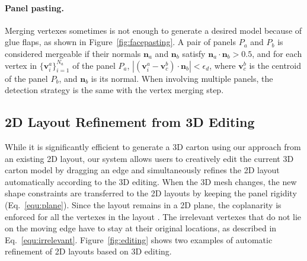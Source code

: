 \paragraph{Panel pasting.} Merging vertexes sometimes is not enough to generate a desired model because of glue flaps, as shown in Figure~\ref{fig:facepasting}. 
A pair of panels $P_a$ and $P_b$ is considered mergeable if their normals $\mathbf{n}_a$ and $\mathbf{n}_b$ satisfy $\mathbf{n}_a \cdot \mathbf{n}_b > 0.5$, and for each vertex in $\{\mathbf{v}^{a}_{i}\}_{i=1}^{N_a}$ of the panel $P_a$,  $|(\mathbf{v}^{a}_{i} - \mathbf{v}_{c}^b) \cdot \mathbf{n}_b| < \epsilon_d$, where $\mathbf{v}_{c}^b$ is the centroid of the panel $P_b$, and $\mathbf{n}_b$ is its normal. When involving multiple panels, the detection strategy is the same with the vertex merging step. 




\subsection{2D Layout Refinement from 3D Editing}

While it is significantly efficient to generate a 3D carton using our approach from an existing 2D layout, our system allows users to creatively edit the current 3D carton model by dragging an edge and simultaneously refines the 2D layout automatically according to the 3D editing.
%
When the 3D mesh changes, the new shape constraints are transferred to the 2D layouts by keeping the panel rigidity (Eq.~\ref{equ:plane}).
Since the layout remains in a 2D plane, the coplanarity is enforced for all the vertexes in the layout . 
%
% 
The irrelevant vertexes that do not lie on the moving edge have to stay at their original locations, as described in Eq.~\ref{equ:irrelevant}.
Figure~\ref{fig:editing} shows two examples of automatic refinement of 2D layouts based on 3D editing.                                                                     



